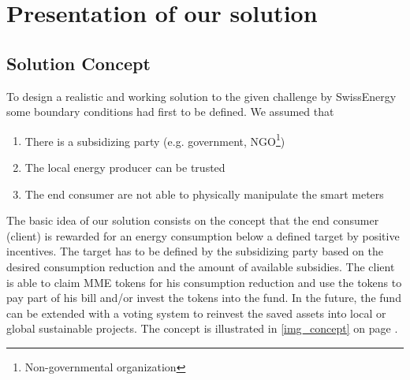 \documentclass[11pt]{article}
\begin{document}
\section{Presentation of our solution}

\subsection{Solution Concept}
To design a realistic and working solution to the given challenge by SwissEnergy some boundary conditions had first to be defined. We assumed that
\begin{enumerate}\itemsep0pt
	\item There is a subsidizing party (e.g. government, NGO\footnote{Non-governmental organization})
	\item The local energy producer can be trusted
	\item The end consumer are not able to physically manipulate the smart meters
\end{enumerate}
The basic idea of our solution consists on the concept that the end consumer (client) is rewarded for an energy consumption below a defined target by positive incentives. The target has to be defined by the subsidizing party based on the desired consumption reduction and the amount of available subsidies. The client is able to claim MME tokens for his consumption reduction and use the tokens to pay part of his bill and/or invest the tokens into the fund. In the future, the fund can be extended with a voting system to reinvest the saved assets into local or global sustainable projects. The concept is illustrated in \ref{img_concept} on page \pageref{img_concept}.

\newpage
\end{document}
